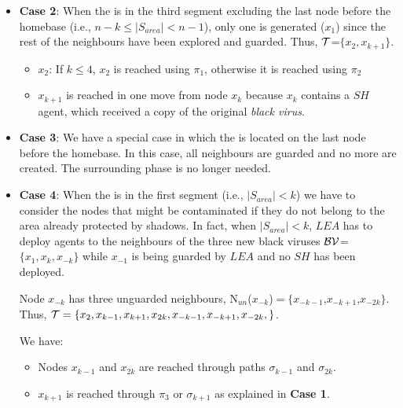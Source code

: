 \begin{itemize}
\begin{itemize}

\end{itemize}

 \item {\bf Case 2}: When the \bv is in the third   segment excluding the last node before the homebase
 (i.e.,   $n-k\leq |S_{area}| <n-1$), only  one \bv is generated ($x_1$) since the rest of the neighbours have been explored and guarded. Thus,
$\cal T$=$\{x_2,x_{k+1}\}$.
\begin{itemize}
\item $x_2$: 
 If  $k \leq4$,  $x_2$ is reached using $\pi_1$, otherwise  it is reached using $\pi_2$ \\
\item $x_{k+1}$ is reached in one move  from node $x_{k}$ because $x_{k}$ contains a $SH$ agent, which received a copy of the original {\it black virus}.  
\end{itemize}
\item  {\bf Case 3}: We have a special case in which the \bv is located  on the last node before the homebase. In this case, all neighbours are guarded and no more \bvs are created. The surrounding phase is no longer needed.

\item {\bf Case 4}:  When the \bv is in the first  segment  (i.e., $\left\vert{S_{area}}\right\vert < k$) 
 we have to  consider the nodes that might be contaminated  if they do not belong to the  area already protected by shadows.
In fact, when $\left\vert{S_{area}}\right\vert < k$, $LEA$ has to deploy agents to the neighbours of the three new black viruses $\cal BV$=$\{x_1,x_k,x_{-k}\}$ while $x_{-1}$ is being guarded by $LEA$ and no $SH$ has been deployed.


Node  $x_{-k}$ has three unguarded neighbours, N$_{un}$($x_{-k}$)$=\{x_{-k-1}$,$x_{-k+1}$,$x_{-2k}\}$.
Thus, ${\cal T} = \{x_{2},x_{k-1},x_{k+1},x_{2k},x_{-k-1},x_{-k+1},x_{-2k},\}$.


We have:
\begin{itemize}
\item Nodes $x_{k-1}$ and $x_{2k} $ are reached through paths $\sigma_{k-1}$ and $\sigma_{2k}$.
\item $x_{k+1}$ is reached through $\pi_3$ or $\sigma_{k+1}$ as   explained in {\bf Case 1}.



\end{itemize}
\end{itemize}
